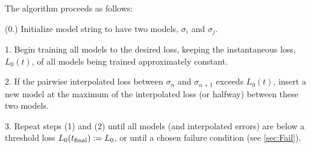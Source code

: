   The algorithm proceeds as follows:
  
  (0.) Initialize model string to have two models, $\sigma_i$ and $\sigma_j$.
  
  1. Begin training all models to the desired loss, keeping the instantaneous loss, $L_0(t)$, of all models being trained approximately constant.
  
  2. If the pairwise interpolated loss between $\sigma_n$ and $\sigma_{n+1}$ exceeds $L_0(t)$, insert a new model at the maximum of the interpolated loss (or halfway) between these two models.
  
  3. Repeat steps (1) and (2) until all models (and interpolated errors) are below a threshold loss $L_0(t_{\rm{final}}):=L_0$, or until a chosen failure condition (see \ref{sec:Fail}).


